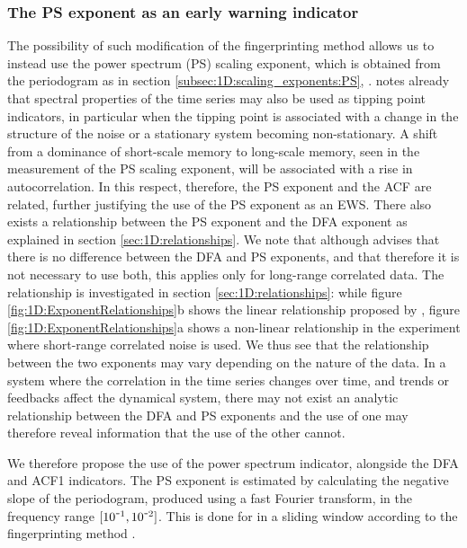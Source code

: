 {\subsubsection{The PS exponent as an early warning indicator}
The possibility of such modification of the fingerprinting method allows us to instead use the power spectrum (PS) scaling exponent, which is obtained from the periodogram as in section \ref{subsec:1D:scaling_exponents:PS}, \citep{prettyman2018}. \citet{kleinen2003} notes already that spectral properties of the time series may also be used as tipping point indicators, in particular when the tipping point is associated with a change in the structure of the noise or a stationary system becoming non-stationary. A shift from a dominance of short-scale memory to long-scale memory, seen in the measurement of the PS scaling exponent, will be associated with a rise in autocorrelation. In this respect, therefore, the PS exponent and the ACF are related, further justifying the use of the PS exponent as an EWS. There also exists a relationship between the PS exponent and the DFA exponent \citep{heneghan2000, kantelhardt2001} as explained in section \ref{sec:1D:relationships}. We note that although \citet{heneghan2000} advises that there is no difference between the DFA and PS exponents, and that therefore it is not necessary to use both, this applies only for long-range correlated data. The relationship is investigated in section \ref{sec:1D:relationships}: while figure \ref{fig:1D:ExponentRelationships}b shows the linear relationship proposed by \citet{kantelhardt2001}, figure \ref{fig:1D:ExponentRelationships}a shows a non-linear relationship in the experiment where short-range correlated noise is used. We thus see that the relationship between the two exponents may vary depending on the nature of the data. In a system where the correlation in the time series changes over time, and trends or feedbacks affect the dynamical system, there may not exist an analytic relationship between the DFA and PS exponents and the use of one may therefore reveal information that the use of the other cannot. 

We therefore propose the use of the power spectrum indicator, alongside the DFA and ACF1 indicators. The PS exponent is estimated by calculating the negative slope of the periodogram, produced using a fast Fourier transform, in the frequency range $[10^{\textup{\texttt{-}}1}, 10^{\textup{\texttt{-}}2}]$. This is done for in a sliding window according to the fingerprinting method \citep{held2004,livina2007}. 

}
